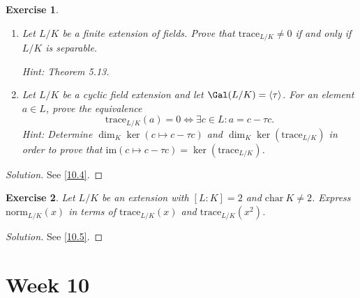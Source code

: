 \documentclass[a4paper,10pt,reqno]{amsart}
\newtheorem{ex}{Exercise}[section]
\newenvironment{sol}
  {\renewcommand\qedsymbol{$\blacksquare$}\begin{proof}[Solution]}
  {\end{proof}}
\begin{document}
\begin{ex}
\label{9.4}~

    \begin{enumerate}[label=(\roman*)]
        \item Let $L/K$ be a finite extension of fields. Prove that $\mathrm{trace}_{L/K} \neq 0$ if and only if $L/K$ is separable.

    \noindent \textit{Hint:} Theorem 5.13.
        \item Let $L/K$ be a cyclic field extension and let $\Gal(L/K) = \left\langle \tau \right\rangle$. For an element $a \in L$, prove the equivalence
        \[
        \mathrm{trace}_{L/K}(a)=0 \Leftrightarrow \exists c \in L: a = c - \tau c.
        \]
        \noindent \textit{Hint:} Determine $\dim_K \ker (c \mapsto c- \tau c)$ and $\dim_K \ker (\mathrm{trace}_{L/K})$ in order to prove that $\mathrm{im}(c \mapsto c - \tau c) = \ker (\mathrm{trace}_{L/K})$.
    \end{enumerate}
\end{ex}
\begin{sol}
    See \cref{10.4}.
\end{sol}


\begin{ex}
\label{9.5}
    Let $L/K$ be an extension with $[L:K] = 2$ and $\mathrm{char}\ K \neq 2$. Express $\mathrm{norm}_{L/K}(x)$ in terms of $\mathrm{trace}_{L/K}(x)$ and $\mathrm{trace}_{L/K}(x^2)$.
\end{ex}
\begin{sol}
    See \cref{10.5}.
\end{sol}

\newpage

\section{Week 10}
\end{document}
